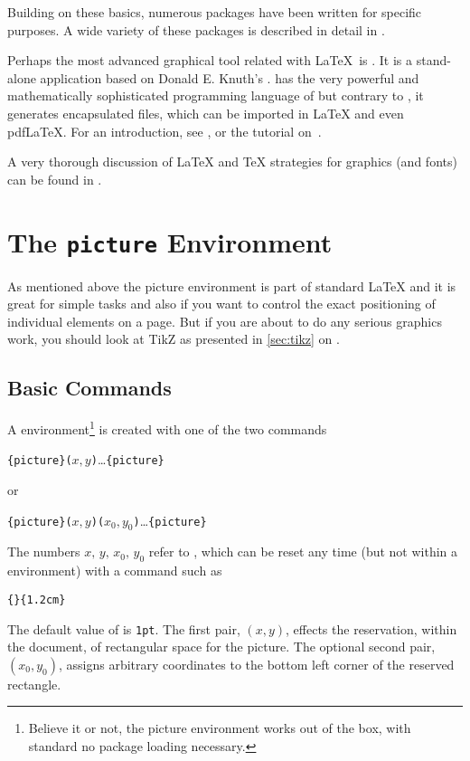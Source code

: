 Building on these basics, numerous packages have been written for specific
purposes. A wide variety of these packages is described in detail in
\graphicscompanion{}.

Perhaps the most advanced graphical tool related with \LaTeX\ is . It is a stand-alone application
based on Donald E. Knuth's .  has the very powerful and
mathematically sophisticated programming language of  but contrary to ,
it generates encapsulated \PSi{} files,
which can be imported in \LaTeX{} and even pdf\LaTeX{}. For an introduction, see \hobby, or the tutorial on~\cite{ursoswald}.

A very thorough discussion of \LaTeX{} and \TeX{} strategies for graphics (and fonts) can
be found in \hoenig.

\section{The \texttt{picture} Environment}

As mentioned above the picture environment is part of standard \LaTeX{} and it is great for simple tasks and also if you want
to control the exact positioning of individual elements on a page. But if you are about to do any serious graphics work, you should
look at TikZ as presented in \autoref{sec:tikz} on .

\subsection{Basic Commands}

A  environment\footnote{Believe it or not, the picture environment works out of the
  box, with standard \LaTeXe{} no package loading necessary.} is created with one of the two commands
\begin{lscommand}
  \verb|{picture}(|$x,y$\verb|)|\ldots{}\verb|{picture}|
\end{lscommand}
\noindent or
\begin{lscommand}
  \verb|{picture}(|$x,y$\verb|)(|$x_0,y_0$\verb|)|\ldots{}\verb|{picture}|
\end{lscommand}
The numbers $x,\,y,\,x_0,\,y_0$ refer to , which can be reset any time
(but not within a  environment) with a command such as
\begin{lscommand}
  \verb|{|\verb|}{1.2cm}|
\end{lscommand}
The default value of  is \texttt{1pt}. The first pair, $(x,y)$, effects
the reservation, within the document, of rectangular space for the picture. The optional
second pair, $(x_0,y_0)$, assigns arbitrary coordinates to the bottom left corner of the
reserved rectangle.

